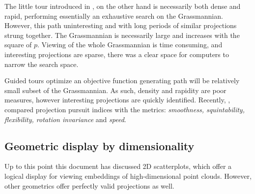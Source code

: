 \documentclass{monashthesis}
\begin{document}
The little tour introduced in \textcite{mcdonald_interactive_1982}, on
the other hand is necessarily both dense and rapid, performing
essentially an exhaustive search on the Grassmannian. However, this path
uninteresting and with long periods of similar projections strung
together. The Grassmannian is necessarily large and increases with the
square of \(p\). Viewing of the whole Grassmannian is time consuming,
and interesting projections are sparse, there was a clear space for
computers to narrow the search space.

Guided tours \autocite{hurley_analyzing_1990} optimize an objective
function generating path will be relatively small subset of the
Grassmannian. As such, density and rapidity are poor measures, however
interesting projections are quickly identified. Recently,
\textcite{laa_using_2019}, compared projection pursuit indices with the
metrics: \emph{smoothness, squintability, flexibility, rotation
invariance} and \emph{speed}.

\subsection{Geometric display by
dimensionality}\label{geometric-display-by-dimensionality}

Up to this point this document has discussed 2D scatterplots, which
offer a logical display for viewing embeddings of high-dimensional point
clouds. However, other geometrics offer perfectly valid projections as
well.
\end{document}
